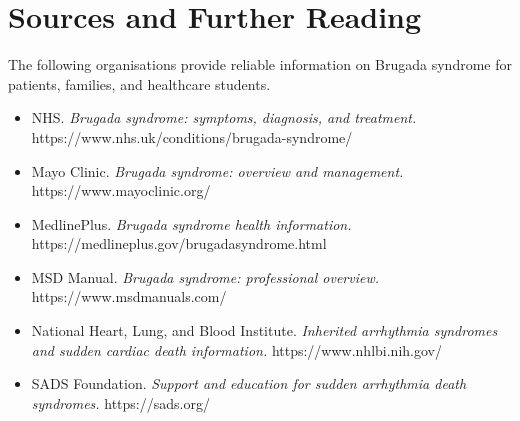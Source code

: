 \section*{Sources and Further Reading}
The following organisations provide reliable information on Brugada syndrome for patients, families, and healthcare students.

\begin{itemize}
    \item NHS. \textit{Brugada syndrome: symptoms, diagnosis, and treatment.} https://www.nhs.uk/conditions/brugada-syndrome/
    \item Mayo Clinic. \textit{Brugada syndrome: overview and management.} https://www.mayoclinic.org/
    \item MedlinePlus. \textit{Brugada syndrome health information.} https://medlineplus.gov/brugadasyndrome.html
    \item MSD Manual. \textit{Brugada syndrome: professional overview.} https://www.msdmanuals.com/
    \item National Heart, Lung, and Blood Institute. \textit{Inherited arrhythmia syndromes and sudden cardiac death information.} https://www.nhlbi.nih.gov/
    \item SADS Foundation. \textit{Support and education for sudden arrhythmia death syndromes.} https://sads.org/
\end{itemize}
